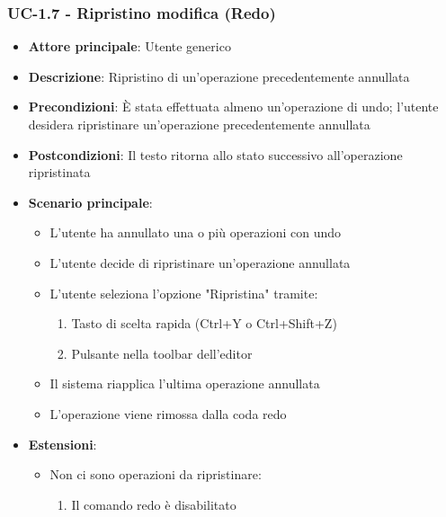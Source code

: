 \documentclass[11pt,a4paper]{article}
\begin{document}
\subsubsection{UC-1.7 - Ripristino modifica (Redo)}
\begin{itemize}
    \item \textbf{Attore principale}: Utente generico
    \item \textbf{Descrizione}: Ripristino di un'operazione precedentemente annullata
    \item \textbf{Precondizioni}: È stata effettuata almeno un'operazione di undo; l'utente desidera ripristinare un'operazione precedentemente annullata
    \item \textbf{Postcondizioni}: Il testo ritorna allo stato successivo all'operazione ripristinata
    \item \textbf{Scenario principale}:
        \begin{itemize}
            \item L'utente ha annullato una o più operazioni con undo
            \item L'utente decide di ripristinare un'operazione annullata
            \item L'utente seleziona l'opzione "Ripristina" tramite:
                \begin{enumerate}
                    \item Tasto di scelta rapida (Ctrl+Y o Ctrl+Shift+Z)
                    \item Pulsante nella toolbar dell'editor
                \end{enumerate}
            \item Il sistema riapplica l'ultima operazione annullata
            \item L'operazione viene rimossa dalla coda redo
        \end{itemize}
    \item \textbf{Estensioni}:
        \begin{itemize}
            \item Non ci sono operazioni da ripristinare:
                \begin{enumerate}
                    \item Il comando redo è disabilitato
                \end{enumerate}
        \end{itemize}
\end{itemize}
\end{document}
